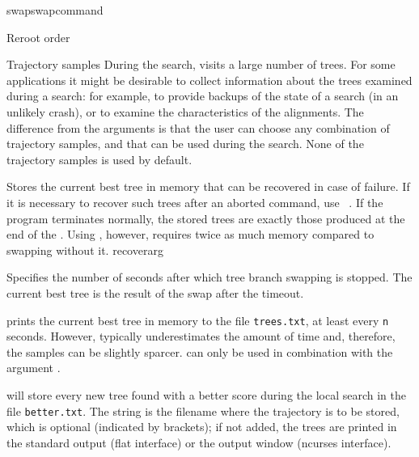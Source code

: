 \begin{command}{swap}{swapcommand}
\begin{arguments}
\begin{argumentgroup}{Reroot order}
        \end{argumentgroup}

	    \begin{argumentgroup}{Trajectory samples}
	        {During the search, \poy visits a large number of trees. For some
            applications it might be desirable to  collect information about the
            trees examined during a search: for example, to provide backups of
            the state of a search (in an unlikely crash), or to examine the
            characteristics of the alignments.  The difference from the
             arguments is that the user can choose any
            combination of trajectory samples, and that can be used during the
            search. None of the trajectory samples is used by default.}

	            {Stores the current best tree in memory that can be recovered in
                case of failure. If it is necessary to recover such trees after
                an aborted command, use ~.  If the program
                terminates normally, the stored trees are exactly those produced
                at the end of the . Using
                , however, requires twice as much memory
                compared to swapping without it.}
                {recoverarg}

                {Specifies the number of seconds after which tree branch
                swapping is stopped. The current best tree is the result of the
                swap after the timeout.} 
                {}

	            {  prints the current
                best tree in memory to the file \texttt{trees.txt}, at least every 
                \texttt{n} seconds. However, \poy typically underestimates the amount of
                time and, therefore, the samples can be slightly sparcer.  
                can only be used in combination with the argument .}
                {}

		    { will store every new tree
                found with a better score during the local search in the file
                \texttt{better.txt}. The string is the filename where the
                trajectory is to be stored, which is optional (indicated by
                brackets); if not added, the trees are printed in the standard
                output (flat interface) or the output window (ncurses
                interface).}
                {} 


\end{argumentgroup}
\end{arguments}
\end{command}

